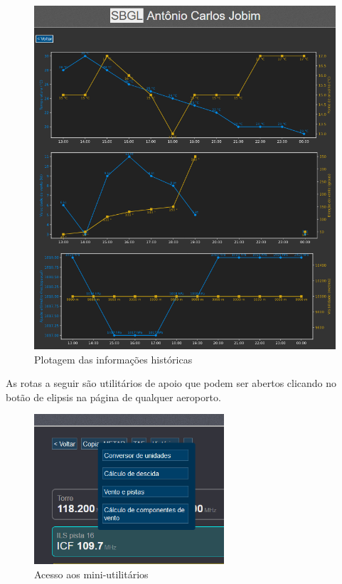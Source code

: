 \begin{figure}[H]
    \begin{center}
    \includegraphics[width=\linewidth]{img/img-history.png}
    \caption{Plotagem das informações históricas}
    \label{fig:img-history.png}
    \end{center}
\end{figure}

As rotas a seguir são utilitários de apoio que podem ser abertos clicando
no botão de elipsis na página de qualquer aeroporto.

\begin{figure}[H]
    \begin{center}
    \includegraphics[width=200pt]{img/elipsis.png}
    \caption{Acesso aos mini-utilitários}
    \label{fig:menu-elipsis}
    \end{center}
\end{figure}

